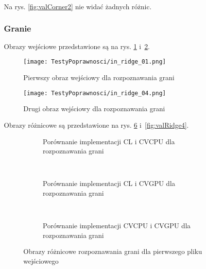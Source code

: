 Na rys. \ref{fig:valCorner2} nie widać żadnych różnic.

\subsubsection{Granie}
\label{subsubsec:granieRysunki}

Obrazy wejściowe przedstawione są na rys. \ref{fig:valRidge01} i~\ref{fig:valRidge04}.

\begin{figure}[h]
\begin{center}
\texttt{[image: TestyPoprawnosci/in\_ridge\_01.png]}
\end{center}
\caption{Pierwszy obraz wejściowy dla rozpoznawania grani}
\label{fig:valRidge01}
\end{figure}

\begin{figure}[h]
\begin{center}
\texttt{[image: TestyPoprawnosci/in\_ridge\_04.png]}
\end{center}
\caption{Drugi obraz wejściowy dla rozpoznawania grani}
\label{fig:valRidge04}
\end{figure}

Obrazy różnicowe są przedstawione na rys. \ref{fig:valRidge1} i~\ref{fig:valRidge4}. 

\begin{figure}[h]
\begin{subfigure}[t]{0.3\textwidth}
	\centering
	\setlength\fboxsep{0pt}
	\setlength\fboxrule{0.5pt}
	\caption{Porównanie implementacji CL i CVCPU dla rozpoznawania grani}
	\label{fig:valRidge1CLCVCPU}
\end{subfigure}
~
\begin{subfigure}[t]{0.3\textwidth}
	\centering
	\setlength\fboxsep{0pt}
	\setlength\fboxrule{0.5pt}
	\caption{Porównanie implementacji CL i CVGPU dla rozpoznawania grani}
	\label{fig:valRidge1CLCVGPU}
\end{subfigure}
~
\begin{subfigure}[t]{0.3\textwidth}
	\centering
	\setlength\fboxsep{0pt}
	\setlength\fboxrule{0.5pt}
	\caption{Porównanie implementacji CVCPU i CVGPU dla rozpoznawania grani}
	\label{fig:valRidge1CVCPUCVGPU}                 
\end{subfigure}
\caption{Obrazy różnicowe rozpoznawania grani dla pierwszego pliku wejściowego}

\label{fig:valRidge1}
\end{figure}

